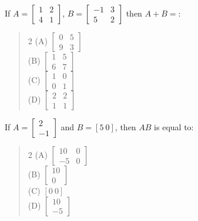 \documentclass[11pt,a4paper]{article}
\begin{document}
\begin{mcqlist}
\item If $A=\begin{bmatrix}1&2\\4&1\end{bmatrix}$, $B=\begin{bmatrix}-1&3\\5&2\end{bmatrix}$ then $A+B=$:
\begin{quote}\begin{multicols}{2}
\noindent (A) $\begin{bmatrix}0&5\\9&3\end{bmatrix}$ \\
(B) $\begin{bmatrix}1&5\\6&7\end{bmatrix}$ \\
(C) $\begin{bmatrix}1&0\\0&1\end{bmatrix}$ \\
(D) $\begin{bmatrix}2&2\\1&1\end{bmatrix}$
\end{multicols}\end{quote}

\item If $A=\begin{bmatrix}2\\-1\end{bmatrix}$ and $B=[5\ 0]$, then $AB$ is equal to:
\begin{quote}\begin{multicols}{2}
\noindent (A) $\begin{bmatrix}10&0\\-5&0\end{bmatrix}$ \\
(B) $\begin{bmatrix}10\\0\end{bmatrix}$ \\
(C) $[0\ 0]$ \\
(D) $\begin{bmatrix}10\\-5\end{bmatrix}$
\end{multicols}\end{quote}


\end{mcqlist}
\end{document}
